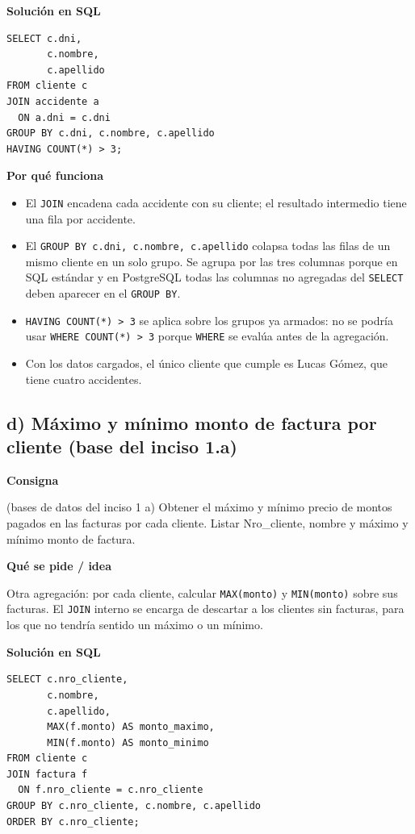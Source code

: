 \documentclass[11pt,a4paper]{article}
\newcommand{\itemcabecera}[1]{\noindent\textbf{#1}\par\medskip}
\newcommand{\bloqueConsigna}{\itemcabecera{Consigna}}
\newcommand{\bloqueIdea}{\itemcabecera{Qu\'e se pide / idea}}
\newcommand{\bloqueSolucion}{\itemcabecera{Soluci\'on en SQL}}
\newcommand{\bloquePorque}{\itemcabecera{Por qu\'e funciona}}
\begin{document}
\bloqueSolucion

\begin{lstlisting}
SELECT c.dni,
       c.nombre,
       c.apellido
FROM cliente c
JOIN accidente a
  ON a.dni = c.dni
GROUP BY c.dni, c.nombre, c.apellido
HAVING COUNT(*) > 3;
\end{lstlisting}

\bloquePorque

\begin{itemize}
    \item El \texttt{JOIN} encadena cada accidente con su cliente; el resultado intermedio tiene una fila por accidente.
    \item El \texttt{GROUP BY c.dni, c.nombre, c.apellido} colapsa todas las filas de un mismo cliente en un solo grupo. Se agrupa por las tres columnas porque en SQL estándar y en PostgreSQL todas las columnas no agregadas del \texttt{SELECT} deben aparecer en el \texttt{GROUP BY}.
    \item \texttt{HAVING COUNT(*) > 3} se aplica sobre los grupos ya armados: no se podría usar \texttt{WHERE COUNT(*) > 3} porque \texttt{WHERE} se evalúa antes de la agregación.
    \item Con los datos cargados, el único cliente que cumple es Lucas Gómez, que tiene cuatro accidentes.
\end{itemize}

\subsection{d) Máximo y mínimo monto de factura por cliente (base del inciso 1.a)}

\bloqueConsigna

(bases de datos del inciso 1 a) Obtener el máximo y mínimo precio de montos pagados en las facturas por cada cliente. Listar Nro\_cliente, nombre y máximo y mínimo monto de factura.

\bloqueIdea

Otra agregación: por cada cliente, calcular \texttt{MAX(monto)} y \texttt{MIN(monto)} sobre sus facturas. El \texttt{JOIN} interno se encarga de descartar a los clientes sin facturas, para los que no tendría sentido un máximo o un mínimo.

\bloqueSolucion

\begin{lstlisting}
SELECT c.nro_cliente,
       c.nombre,
       c.apellido,
       MAX(f.monto) AS monto_maximo,
       MIN(f.monto) AS monto_minimo
FROM cliente c
JOIN factura f
  ON f.nro_cliente = c.nro_cliente
GROUP BY c.nro_cliente, c.nombre, c.apellido
ORDER BY c.nro_cliente;
\end{lstlisting}
\end{document}
